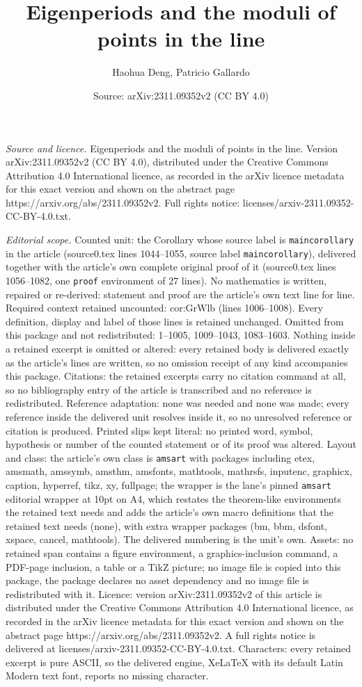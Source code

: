 \documentclass[10pt,a4paper]{amsart}
\title[Eigenperiods and the moduli of points in the line]{Eigenperiods and the moduli of points in the line}
\author{Haohua Deng, Patricio Gallardo}
\date{Source: arXiv:2311.09352v2 (CC BY 4.0)}
\begin{document}
\maketitle

\noindent\emph{Source and licence.} Eigenperiods and the moduli of points in the line. Version arXiv:2311.09352v2 (CC BY 4.0), distributed under the Creative Commons Attribution 4.0 International licence, as recorded in the arXiv licence metadata for this exact version and shown on the abstract page https://arxiv.org/abs/2311.09352v2. Full rights notice: licenses/arxiv-2311.09352-CC-BY-4.0.txt.\par\smallskip

\noindent\textit{Editorial scope.} Counted unit: the Corollary whose source label is \texttt{maincorollary} in the article (source0.tex lines 1044--1055, source label \texttt{maincorollary}), delivered together with the article's own complete original proof of it (source0.tex lines 1056--1082, one \texttt{proof} environment of 27 lines). No mathematics is written, repaired or re-derived: statement and proof are the article's own text line for line. Required context retained uncounted: cor:GrWlb (lines 1006--1008). Every definition, display and label of those lines is retained unchanged. Omitted from this package and not redistributed: 1--1005, 1009--1043, 1083--1603. Nothing inside a retained excerpt is omitted or altered: every retained body is delivered exactly as the article's lines are written, so no omission receipt of any kind accompanies this package. Citations: the retained excerpts carry no citation command at all, so no bibliography entry of the article is transcribed and no reference is redistributed. Reference adaptation: none was needed and none was made; every reference inside the delivered unit resolves inside it, so no unresolved reference or citation is produced. Printed slips kept literal: no printed word, symbol, hypothesis or number of the counted statement or of its proof was altered. Layout and class: the article's own class is \texttt{amsart} with packages including etex, amsmath, amssymb, amsthm, amsfonts, mathtools, mathrsfs, inputenc, graphicx, caption, hyperref, tikz, xy, fullpage; the wrapper is the lane's pinned \texttt{amsart} editorial wrapper at 10pt on A4, which restates the theorem-like environments the retained text needs and adds the article's own macro definitions that the retained text needs (none), with extra wrapper packages (bm, bbm, dsfont, xspace, cancel, mathtools). The delivered numbering is the unit's own. Assets: no retained span contains a figure environment, a graphics-inclusion command, a PDF-page inclusion, a table or a TikZ picture; no image file is copied into this package, the package declares no asset dependency and no image file is redistributed with it. Licence: version arXiv:2311.09352v2 of this article is distributed under the Creative Commons Attribution 4.0 International licence, as recorded in the arXiv licence metadata for this exact version and shown on the abstract page https://arxiv.org/abs/2311.09352v2. A full rights notice is delivered at licenses/arxiv-2311.09352-CC-BY-4.0.txt. Characters: every retained excerpt is pure ASCII, so the delivered engine, XeLaTeX with its default Latin Modern text font, reports no missing character.
\end{document}
